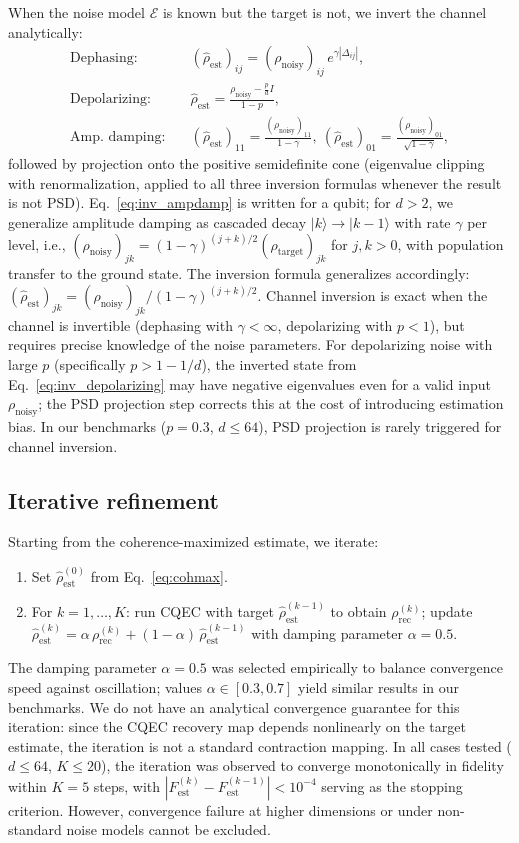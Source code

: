 \documentclass[prx,twocolumn,superscriptaddress,longbibliography,floatfix]{revtex4-2}
\newcommand{\EE}{\mathcal{E}}
\newcommand{\Fest}{F_\mathrm{est}}
\newcommand{\rhot}{\rho_\mathrm{target}}
\newcommand{\rhon}{\rho_\mathrm{noisy}}
\newcommand{\rhor}{\rho_\mathrm{rec}}
\newcommand{\rhoe}{\hat{\rho}_\mathrm{est}}
\begin{document}
When the noise model $\EE$ is known but the target is not, we invert the channel analytically:
\begin{align}
\text{Dephasing:}\quad & (\rhoe)_{ij} = (\rhon)_{ij}\,e^{\gamma|\Delta_{ij}|}, \label{eq:inv_dephasing}\\
\text{Depolarizing:}\quad & \rhoe = \frac{\rhon - \frac{p}{d}I}{1-p}, \label{eq:inv_depolarizing}\\
\text{Amp.\ damping:}\quad & (\rhoe)_{11} = \frac{(\rhon)_{11}}{1-\gamma},\ (\rhoe)_{01} = \frac{(\rhon)_{01}}{\sqrt{1-\gamma}}, \label{eq:inv_ampdamp}
\end{align}
followed by projection onto the positive semidefinite cone (eigenvalue clipping with renormalization, applied to all three inversion formulas whenever the result is not PSD).
Eq.~\eqref{eq:inv_ampdamp} is written for a qubit; for $d > 2$, we generalize amplitude damping as cascaded decay $|k\rangle \to |k-1\rangle$ with rate $\gamma$ per level, i.e., $(\rhon)_{jk} = (1-\gamma)^{(j+k)/2} (\rhot)_{jk}$ for $j,k > 0$, with population transfer to the ground state.
The inversion formula generalizes accordingly: $(\rhoe)_{jk} = (\rhon)_{jk} / (1-\gamma)^{(j+k)/2}$.
Channel inversion is exact when the channel is invertible (dephasing with $\gamma < \infty$, depolarizing with $p < 1$), but requires precise knowledge of the noise parameters.
For depolarizing noise with large $p$ (specifically $p > 1 - 1/d$), the inverted state from Eq.~\eqref{eq:inv_depolarizing} may have negative eigenvalues even for a valid input $\rhon$; the PSD projection step corrects this at the cost of introducing estimation bias.
In our benchmarks ($p = 0.3$, $d \leq 64$), PSD projection is rarely triggered for channel inversion.


\subsection{Iterative refinement}
\label{sec:iterative}

Starting from the coherence-maximized estimate, we iterate:
\begin{enumerate}
\item Set $\rhoe^{(0)}$ from Eq.~\eqref{eq:cohmax}.
\item For $k = 1, \ldots, K$: run CQEC with target $\rhoe^{(k-1)}$ to obtain $\rhor^{(k)}$; update $\rhoe^{(k)} = \alpha\,\rhor^{(k)} + (1-\alpha)\,\rhoe^{(k-1)}$ with damping parameter $\alpha = 0.5$.
\end{enumerate}
The damping parameter $\alpha = 0.5$ was selected empirically to balance convergence speed against oscillation; values $\alpha \in [0.3, 0.7]$ yield similar results in our benchmarks.
We do not have an analytical convergence guarantee for this iteration: since the CQEC recovery map depends nonlinearly on the target estimate, the iteration is not a standard contraction mapping.
In all cases tested ($d \leq 64$, $K \leq 20$), the iteration was observed to converge monotonically in fidelity within $K = 5$ steps, with $|\Fest^{(k)} - \Fest^{(k-1)}| < 10^{-4}$ serving as the stopping criterion.
However, convergence failure at higher dimensions or under non-standard noise models cannot be excluded.
\end{document}
